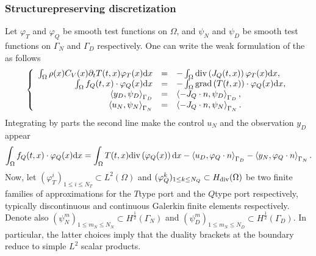 \documentclass[letterpaper,10pt,english]{sphinxmanual}
\begin{document}
\subsubsection{Structure\sphinxhyphen{}preserving discretization}
\label{\detokenize{examples/heat:structure-preserving-discretization}}
\sphinxAtStartPar
Let \(\varphi_T\) and \(\varphi_Q\) be smooth test functions on
\(\Omega\), and \(\psi_N\) and \(\psi_D\) be smooth test
functions on \(\Gamma_N\) and \(\Gamma_D\) respectively. One can
write the weak formulation of the  as follows
\begin{equation*}
\begin{split}\left\lbrace
\begin{array}{rcl}
\int_\Omega \rho(x) C_V(x) \partial_t T(t,x) \varphi_T(x) {\rm d}x &=& - \int_\Omega {\rm div} \left( J_Q(t,x) \right) \varphi_T(x) {\rm d}x, \\
\int_\Omega f_Q(t,x) \cdot \varphi_Q(x) {\rm d}x &=& - \int_\Omega {\rm grad} \left( T(t,x) \right) \cdot \varphi_Q(x) {\rm d}x, \\
\left\langle y_D, \psi_D \right\rangle_{\Gamma_D} &=& \left\langle -J_Q \cdot n, \psi_D \right\rangle_{\Gamma_D}, \\
\left\langle u_N, \psi_N \right\rangle_{\Gamma_N} &=& \left\langle -J_Q \cdot n, \psi_N \right\rangle_{\Gamma_N}.
\end{array}
\right.\end{split}
\end{equation*}
\sphinxAtStartPar
Integrating by parts the second line make the control \(u_N\) and
the observation \(y_D\) appear
\begin{equation*}
\begin{split}\int_\Omega f_Q(t,x) \cdot \varphi_Q(x) {\rm d}x = \int_\Omega T(t,x) {\rm div} \left( \varphi_Q(x) \right) {\rm d}x - \left\langle u_D, \varphi_Q \cdot n \right\rangle_{\Gamma_D} - \left\langle y_N, \varphi_Q \cdot n \right\rangle_{\Gamma_N}.\end{split}
\end{equation*}
\sphinxAtStartPar
Now, let \((\varphi_T^i)_{1 \le i \le N_T} \subset L^2(\Omega)\) and
\((\varphi_Q^k)_{1 \le k \le N_Q} \subset H_{\rm div}(\Omega)\) be
two finite families of approximations for the \(T\)\sphinxhyphen{}type port and
the \(Q\)\sphinxhyphen{}type port respectively, typically discontinuous and
continuous Galerkin finite elements respectively. Denote also
\((\psi_N^m)_{1 \le m_N \le N_N} \subset H^{\frac12}(\Gamma_N)\) and
\((\psi_D^m)_{1 \le m_N \le N_D} \subset H^{\frac12}(\Gamma_D)\). In
particular, the latter choices imply that the duality brackets at the
boundary reduce to simple \(L^2\) scalar products.
\end{document}
